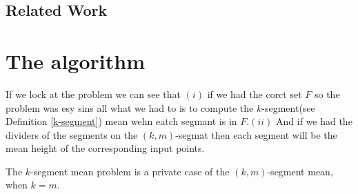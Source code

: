 \documentclass{vldb}
\begin{document}
\subsection{Related Work}

\section{The algorithm}
If we lock at the problem we can see that $(i)$ if we had the corct set $F$
so the problem was esy sins all what we had to is to compute the $k$-segment(see Definition \ref{k-segment}) mean wehn eatch segmant is in $F$.$(ii)$ And if we had the dividers of the segments on the $(k,m)$-segmat then each segment
will be the mean height of the corresponding input points. 

\begin{definition} \label{k-segment}
The $k$-segment mean problem is a private case of the $(k,m)$-segment mean, when $k = m$.

\end{definition}
\end{document}
